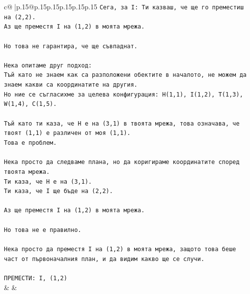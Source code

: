 \documentclass{article}
\begin{document}
{\begin{supertabular}{c@{$\;$}|p{.15\linewidth}@{}p{.15\linewidth}p{.15\linewidth}p{.15\linewidth}p{.15\linewidth}p{.15\linewidth}}
{{{\texttt{Сега, за I: Ти казваш, че ще го преместиш на (2,2).} \\
\texttt{Аз ще преместя I на (1,2) в моята мрежа.} \\
\\ 
\texttt{Но това не гарантира, че ще съвпаднат.} \\
\\ 
\texttt{Нека опитаме друг подход:} \\
\texttt{Тъй като не знаем как са разположени обектите в началото, не можем да знаем какви са координатите на другия.} \\
\texttt{Но ние се съгласихме за целева конфигурация: H(1,1), I(1,2), T(1,3), W(1,4), C(1,5).} \\
\\ 
\texttt{Тъй като ти каза, че H е на (3,1) в твоята мрежа, това означава, че твоят (1,1) е различен от моя (1,1).} \\
\texttt{Това е проблем.} \\
\\ 
\texttt{Нека просто да следваме плана, но да коригираме координатите според твоята мрежа.} \\
\texttt{Ти каза, че H е на (3,1).} \\
\texttt{Ти каза, че I ще бъде на (2,2).} \\
\\ 
\texttt{Аз ще преместя I на (1,2) в моята мрежа.} \\
\\ 
\texttt{Но това не е правилно.} \\
\\ 
\texttt{Нека просто да преместя I на (1,2) в моята мрежа, защото това беше част от първоначалния план, и да видим какво ще се случи.} \\
\\ 
\texttt{ПРЕМЕСТИ: I, (1,2)} \\
            }
        }
    }
    & & \\ \\


\end{supertabular}}
\end{document}
